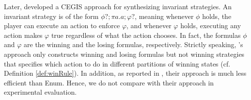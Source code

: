 \documentclass[review]{elsarticle}
\begin{document}
Later, \citet{LuoL2022} developed a CEGIS approach for synthesizing invariant strategies. 
An invariant strategy is of the form $\phi?; \pi a. a; \varphi?$, meaning whenever $\phi$ holds, the player can execute an action to enforce $\varphi$, and whenever $\varphi$ holds, executing any action makes $\varphi$ true regardless of what the action chooses.
In fact, the formulas $\phi$ and $\varphi$ are the winning and the losing formulas, respectively.
Strictly speaking, \citet{LuoL2022}'s approach only constructs winning and losing formulas but not winning strategies that specifies which action to do in different partitions of winning states (cf. Definition \ref{def:winRule}).
In addition, as reported in \cite{LuoL2022}, their approach is much less efficient than Enum.
Hence, we do not compare with their approach in experimental evaluation.
\end{document}
